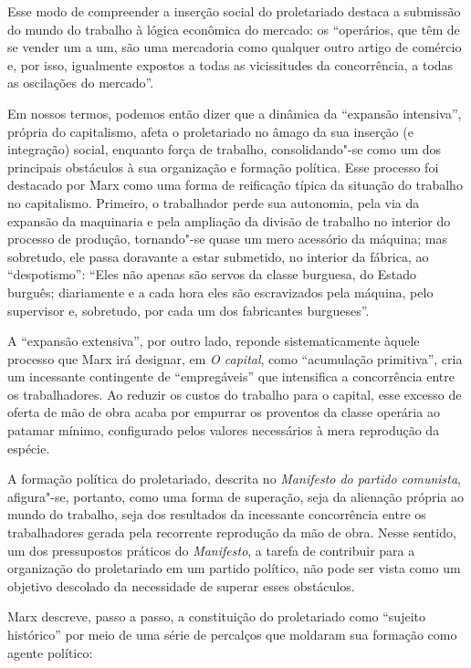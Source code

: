 Esse modo de compreender a inserção social do proletariado destaca a
submissão do mundo do trabalho à lógica econômica do mercado: os
“operários, que têm de se vender um a um, são uma mercadoria como
qualquer outro artigo de comércio e, por isso, igualmente expostos a
todas as vicissitudes da concorrência, a todas as oscilações do
mercado”.

Em nossos termos, podemos então dizer que a dinâmica da “expansão
intensiva”, própria do capitalismo, afeta o proletariado no âmago da sua
inserção (e integração) social, enquanto força de trabalho,
consolidando"-se como um dos principais obstáculos à sua organização e
formação política. Esse processo foi destacado por Marx como uma forma
de reificação típica da situação do trabalho no capitalismo. Primeiro,
o trabalhador perde sua autonomia, pela via da expansão da maquinaria e
pela ampliação da divisão de trabalho no interior do processo de
produção, tornando"-se quase um mero acessório da máquina; mas
sobretudo, ele passa doravante a estar submetido, no interior da
fábrica, ao “despotismo”: “Eles não apenas são servos da classe
burguesa, do Estado burguês; diariamente e a cada hora eles são
escravizados pela máquina, pelo supervisor e, sobretudo, por cada um
dos fabricantes burgueses”.

A “expansão extensiva”, por outro lado, reponde sistematicamente àquele
processo que Marx irá designar, em \textit{O capital}, como “acumulação
primitiva”, cria um incessante contingente de “empregáveis” que
intensifica a concorrência entre os trabalhadores. Ao reduzir os custos
do trabalho para o capital, esse excesso de oferta de mão de obra
acaba por empurrar os proventos da classe operária ao patamar mínimo,
configurado pelos valores necessários à mera reprodução da espécie.

A formação política do proletariado, descrita no \textit{Manifesto do
partido comunista}, afigura"-se, portanto, como uma forma de superação,
seja da alienação própria ao mundo do trabalho, seja dos resultados da
incessante concorrência entre os trabalhadores gerada pela recorrente
reprodução da mão de obra. Nesse sentido, um dos pressupostos
práticos do \textit{Manifesto}, a tarefa de contribuir para a
organização do proletariado em um partido político, não pode ser vista
como um objetivo descolado da necessidade de superar esses obstáculos.

Marx descreve, passo a passo, a constituição do proletariado como
“sujeito histórico” por meio de uma série de percalços que moldaram sua
formação como agente político: 

